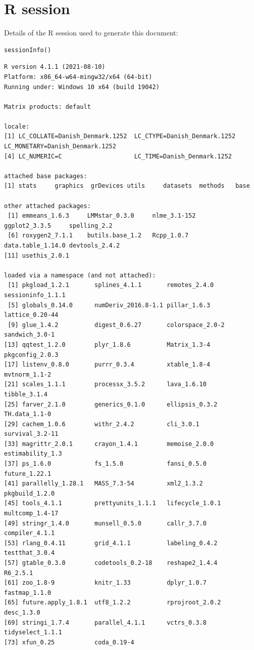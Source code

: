 \documentclass[12pt]{article}
\begin{document}
\clearpage

\section{R session}
\label{sec:orgd7d0e97}
Details of the R session used to generate this document:
\lstset{language=r,label= ,caption= ,captionpos=b,numbers=none}
\begin{lstlisting}
sessionInfo()
\end{lstlisting}

\begin{verbatim}
R version 4.1.1 (2021-08-10)
Platform: x86_64-w64-mingw32/x64 (64-bit)
Running under: Windows 10 x64 (build 19042)

Matrix products: default

locale:
[1] LC_COLLATE=Danish_Denmark.1252  LC_CTYPE=Danish_Denmark.1252    LC_MONETARY=Danish_Denmark.1252
[4] LC_NUMERIC=C                    LC_TIME=Danish_Denmark.1252    

attached base packages:
[1] stats     graphics  grDevices utils     datasets  methods   base     

other attached packages:
 [1] emmeans_1.6.3     LMMstar_0.3.0     nlme_3.1-152      ggplot2_3.3.5     spelling_2.2     
 [6] roxygen2_7.1.1    butils.base_1.2   Rcpp_1.0.7        data.table_1.14.0 devtools_2.4.2   
[11] usethis_2.0.1    

loaded via a namespace (and not attached):
 [1] pkgload_1.2.1       splines_4.1.1       remotes_2.4.0       sessioninfo_1.1.1  
 [5] globals_0.14.0      numDeriv_2016.8-1.1 pillar_1.6.3        lattice_0.20-44    
 [9] glue_1.4.2          digest_0.6.27       colorspace_2.0-2    sandwich_3.0-1     
[13] qqtest_1.2.0        plyr_1.8.6          Matrix_1.3-4        pkgconfig_2.0.3    
[17] listenv_0.8.0       purrr_0.3.4         xtable_1.8-4        mvtnorm_1.1-2      
[21] scales_1.1.1        processx_3.5.2      lava_1.6.10         tibble_3.1.4       
[25] farver_2.1.0        generics_0.1.0      ellipsis_0.3.2      TH.data_1.1-0      
[29] cachem_1.0.6        withr_2.4.2         cli_3.0.1           survival_3.2-11    
[33] magrittr_2.0.1      crayon_1.4.1        memoise_2.0.0       estimability_1.3   
[37] ps_1.6.0            fs_1.5.0            fansi_0.5.0         future_1.22.1      
[41] parallelly_1.28.1   MASS_7.3-54         xml2_1.3.2          pkgbuild_1.2.0     
[45] tools_4.1.1         prettyunits_1.1.1   lifecycle_1.0.1     multcomp_1.4-17    
[49] stringr_1.4.0       munsell_0.5.0       callr_3.7.0         compiler_4.1.1     
[53] rlang_0.4.11        grid_4.1.1          labeling_0.4.2      testthat_3.0.4     
[57] gtable_0.3.0        codetools_0.2-18    reshape2_1.4.4      R6_2.5.1           
[61] zoo_1.8-9           knitr_1.33          dplyr_1.0.7         fastmap_1.1.0      
[65] future.apply_1.8.1  utf8_1.2.2          rprojroot_2.0.2     desc_1.3.0         
[69] stringi_1.7.4       parallel_4.1.1      vctrs_0.3.8         tidyselect_1.1.1   
[73] xfun_0.25           coda_0.19-4
\end{verbatim}
\end{document}
